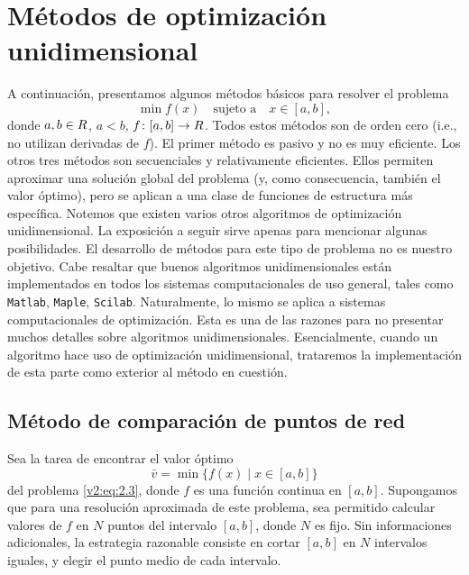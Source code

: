
\section{Métodos de optimización unidimensional}

A continuación, presentamos algunos métodos básicos para resolver el problema
\begin{equation}
    \min f(x) \quad \text{sujeto a} \quad x \in [a, b],
    \label{v2:eq:2.3}
\end{equation}
donde $a, b \in R$, $a < b$, $f \colon [a, b] \to R$. Todos estos métodos son de orden cero (i.e., no utilizan derivadas de $f$). El primer método es pasivo y no es muy eficiente. Los otros tres métodos son secuenciales y relativamente eficientes. Ellos permiten aproximar una solución global del problema (y, como consecuencia, también el valor óptimo), pero se aplican a una clase de funciones de estructura más específica. Notemos que existen varios otros algoritmos de optimización unidimensional. La exposición a seguir sirve apenas para mencionar algunas posibilidades. El desarrollo de métodos para este tipo de problema no es nuestro objetivo. Cabe resaltar que buenos algoritmos unidimensionales están implementados en todos los sistemas computacionales de uso general, tales como \texttt{Matlab}, \texttt{Maple}, \texttt{Scilab}. Naturalmente, lo mismo se aplica a sistemas computacionales de optimización. Esta es una de las razones para no presentar muchos detalles sobre algoritmos unidimensionales. Esencialmente, cuando un algoritmo hace uso de optimización unidimensional, trataremos la implementación de esta parte como exterior al método en cuestión.

\subsection{Método de comparación de puntos de red}

Sea la tarea de encontrar el valor óptimo
\[
    \bar{v} = \min \{ f(x) \mid x \in [a, b] \}
\]
del problema \eqref{v2:eq:2.3}, donde $f$ es una función continua en $[a, b]$.
Supongamos que para una resolución aproximada de este problema, sea permitido calcular valores de $f$ en $N$ puntos del intervalo $[a, b]$, donde $N$ es fijo. Sin informaciones adicionales, la estrategia razonable consiste en cortar $[a, b]$ en $N$ intervalos iguales, y elegir el punto medio de cada intervalo.

